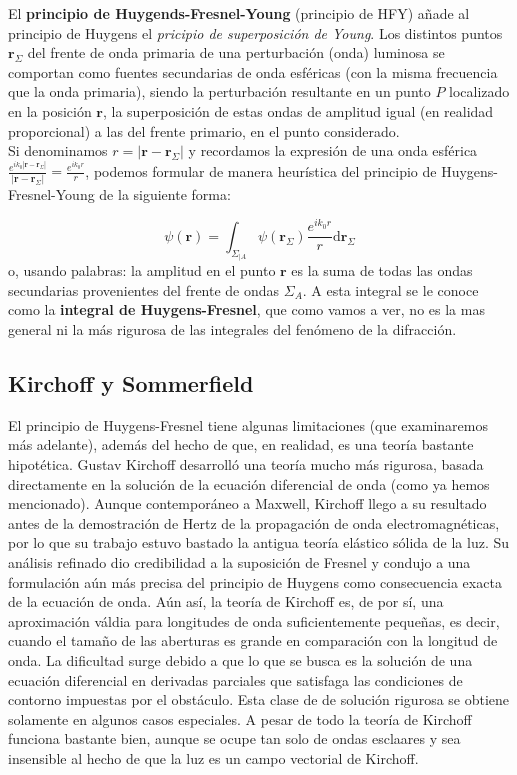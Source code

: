 \documentclass[12pt,a4paper]{book}
\numberwithin{equation}{section}
\numberwithin{figure}{section}
\newcommand{\D}{\mathrm{d}}
\newcommand{\1}{_{(1)}}
\newcommand{\2}{_{(2)}}
\newcommand{\rn}{\mathbf{r}}
\theoremstyle{definition}
\begin{document}
El \textbf{principio de Huygends-Fresnel-Young} (principio de HFY) añade al principio de Huygens el \textit{pricipio de superposición de Young}. Los distintos puntos $\rn_\Sigma$ del frente de onda primaria de una perturbación (onda) luminosa se comportan como fuentes secundarias de onda esféricas (con la misma frecuencia que la onda primaria), siendo la perturbación resultante en un punto $P$ localizado en la posición $\rn$, la superposición de estas ondas de amplitud igual (en realidad proporcional) a las del frente primario, en el punto considerado.   \\

Si denominamos $r=|\rn-\rn_\Sigma|$ y recordamos la expresión de una onda esférica $\frac{e^{ik_0|\rn-\rn_\Sigma|}}{|\rn-\rn_\Sigma|}=\frac{e^{ik_0r}}{r}$, podemos formular de manera heurística del principio de Huygens-Fresnel-Young de la siguiente forma:

\begin{equation}
    \psi (\rn) =  \int_{\Sigma_{|A}} \psi (\rn_{\Sigma}) \frac{e^{ik_0r}}{r}  \D \rn_\Sigma
\end{equation}
o, usando palabras: la amplitud en el punto $\rn$ es la suma de todas las ondas secundarias provenientes del frente de ondas $\Sigma_A$. A esta integral se le conoce como la \textbf{integral de Huygens-Fresnel}, que como vamos a ver, no es la mas general ni la más rigurosa de las integrales del fenómeno de la difracción. 

\subsection{Kirchoff y Sommerfield}

El principio de Huygens-Fresnel tiene algunas limitaciones (que examinaremos más adelante), además del hecho de que, en realidad, es una teoría bastante hipotética. Gustav Kirchoff desarrolló una teoría mucho más rigurosa, basada directamente en la solución de la ecuación diferencial de onda (como ya hemos mencionado). Aunque contemporáneo a Maxwell, Kirchoff llego a su resultado antes de la demostración de Hertz de la propagación de onda electromagnéticas, por lo que su trabajo estuvo bastado la antigua teoría elástico sólida de la luz. Su análisis refinado dio credibilidad a la suposición de Fresnel y condujo a una formulación aún más precisa del principio de Huygens como consecuencia exacta de la ecuación de onda. Aún así, la teoría de Kirchoff es, de por sí, una aproximación váldia para longitudes de onda suficientemente pequeñas, es decir, cuando el tamaño de las aberturas es grande en comparación con la longitud de onda. La dificultad surge debido a que lo que se busca es la solución de una ecuación diferencial en derivadas parciales que satisfaga las condiciones de contorno impuestas por el obstáculo. Esta clase de de solución rigurosa se obtiene solamente en algunos casos especiales. A pesar de todo la teoría de Kirchoff funciona bastante bien,  aunque se ocupe tan solo de ondas esclaares y sea insensible al hecho de que la luz es un campo vectorial de Kirchoff. \\
\end{document}
